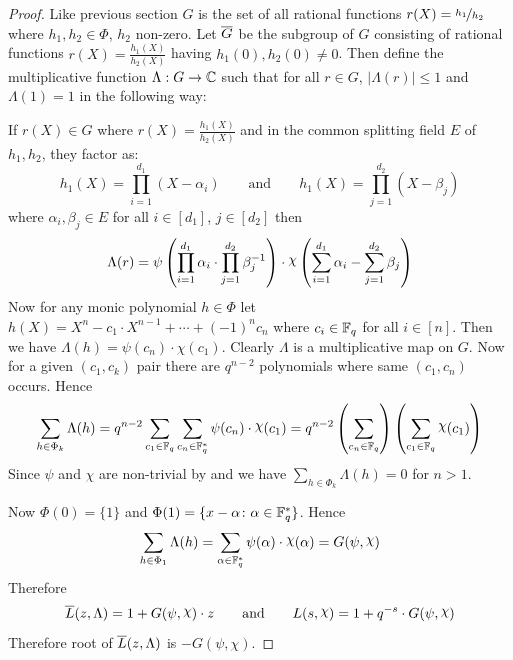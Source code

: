 \begin{proof}
  Like previous section $G$ is the set of all rational functions $r(X)=\nicefrac{h_1}{h_2}$ where $h_1,h_2\in\Phi$, $h_2$ non-zero. Let $\overline{G}$ be the subgroup of $G$ consisting of rational functions $r(X)=\frac{h_1(X)}{h_2(X)}$ having $h_1(0),h_2(0)\neq 0$. Then define the multiplicative function $\Lambda:G\to \mathbb{C}$ such that for all $r\in G$, $|\Lambda(r)|\leq 1$ and $\Lambda(1)=1$ in the following way: 

  If $r(X)\in G$ where $r(X)=\frac{h_1(X)}{h_2(X)}$ and in the common splitting field $E$ of $h_1,h_2$, they factor as: $$h_1(X)=\prod_{i=1}^{d_1}(X-\alpha_i)\qquad \text{and}\qquad h_1(X)=\prod_{j=1}^{d_2}(X-\beta_j)$$ where $\alpha_i,\beta_j\in E$ for all $i\in[d_1]$, $j\in[d_2]$ then $$\Lambda(r)=\psi\lt(\prod_{i=1}^{d_1}\alpha_i \cdot \prod_{j=1}^{d_2}\beta_j^{-1}\rt)\cdot \chi\lt(\sum_{i=1}^{d_1}\alpha_i-\sum_{j=1}^{d_2}\beta_j\rt)$$Now for any monic polynomial $h\in\Phi$ let $h(X)=X^n-c_1\cdot X^{n-1}+\cdots +(-1)^nc_n$ where $c_i\in\mathbb{F}_q$ for all $i\in[n]$. Then we have $\Lambda(h)=\psi(c_n)\cdot \chi(c_1)$. Clearly $\Lambda$ is a multiplicative map on $G$. Now for a given $(c_1,c_k)$ pair there are $q^{n-2}$ polynomials where same $(c_1,c_n)$ occurs. Hence $$\sum_{h\in\Phi_k}\Lambda(h)=q^{n-2}\sum_{c_1\in\bbF_q}\sum_{c_n\in\bbF_q^*}\psi(c_n)\cdot \chi(c_1)=q^{n-2}\lt(\sum_{c_n\in\bbF_q}\rt)\lt(\sum_{c_1\in\bbF_q}\chi(c_1)\rt)$$Since $\psi$ and $\chi$ are non-trivial by  and  we have $\sum_{h\in\Phi_k}\Lambda(h)=0$ for $n>1$. 

  Now $\Phi(0)=\{1\}$ and $\Phi(1)=\{x-\alpha\colon \alpha\in\mathbb{F}_q^*\}$. Hence $$\sum_{h\in\Phi_1}\Lambda(h)=\sum_{\alpha\in\bbF_q^*}\psi(\alpha)\cdot \chi(\alpha)=G(\psi,\chi)$$Therefore $$\ovL(z,\Lambda)=1+G(\psi,\chi)\cdot z\qquad\text{and}\qquad L(s,\chi)=1+q^{-s}\cdot G(\psi,\chi)$$Therefore root of $\overline{L}(z,\Lambda)$ is $-G(\psi,\chi)$.  


\end{proof}
